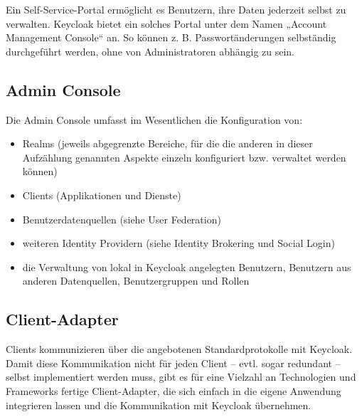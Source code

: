 Ein Self-Service-Portal ermöglicht es Benutzern, ihre Daten jederzeit selbst zu verwalten. Keycloak bietet ein solches Portal unter dem Namen „Account Management Console“ an. 
So können z. B. Passwortänderungen selbständig durchgeführt werden, ohne von Administratoren abhängig zu sein.
\cite{sysarch-keycloak-2}

\subsection{Admin Console}

Die Admin Console umfasst im Wesentlichen die Konfiguration von:
\begin{itemize}
    \item Realms (jeweils abgegrenzte Bereiche, für die die anderen in dieser Aufzählung genannten Aspekte einzeln konfiguriert bzw. verwaltet werden können)
    \item Clients (Applikationen und Dienste)
    \item Benutzerdatenquellen (siehe User Federation)
    \item weiteren Identity Providern (siehe Identity Brokering und Social Login)
    \item die Verwaltung von lokal in Keycloak angelegten Benutzern, Benutzern aus anderen Datenquellen, Benutzergruppen und Rollen
\end{itemize}
\cite{sysarch-keycloak-2}

\subsection{Client-Adapter}

Clients kommunizieren über die angebotenen Standardprotokolle mit Keycloak. Damit diese Kommunikation nicht für jeden Client – evtl. sogar redundant – selbst implementiert werden muss, 
gibt es für eine Vielzahl an Technologien und Frameworks fertige Client-Adapter, die sich einfach in die eigene Anwendung integrieren lassen und die Kommunikation mit Keycloak übernehmen. 
\cite{sysarch-keycloak-2}
